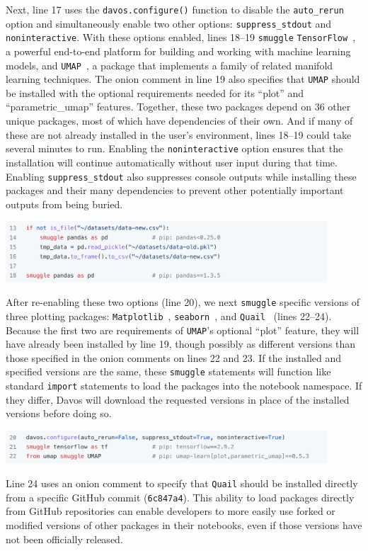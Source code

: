 \documentclass[preprint,12pt,a4paper]{elsarticle}
\begin{document}
Next, line 17 uses the \texttt{davos.configure()} function to disable
the \texttt{auto\_rerun} option and simultaneously enable two other
options: \texttt{suppress\_stdout} and \texttt{noninteractive}. With
these options enabled, lines 18--19 \texttt{smuggle}
\texttt{TensorFlow}~\cite{AbadEtal15}, a powerful end-to-end platform
for building and working with machine learning models, and
\texttt{UMAP}~\cite{McInEtal18}, a package that implements a family
of related manifold learning techniques. The onion comment in line 19
also specifies that \texttt{UMAP} should be installed with the
optional requirements needed for its ``plot'' and ``parametric\_umap''
features. Together, these two packages depend on 36 other unique
packages, most of which have dependencies of their own. And if many of
these are not already installed in the user's environment, lines
18--19 could take several minutes to run.  Enabling the
\texttt{noninteractive} option ensures that the installation will
continue automatically without user input during that time.  Enabling
\texttt{suppress\_stdout} also suppresses console outputs while installing
these packages and their many dependencies to prevent other potentially important outputs from being buried.
\begin{center}
\includegraphics[width=0.9\textwidth]{figs/example4}
\end{center}

After re-enabling these two options (line 20), we next \texttt{smuggle}
specific versions of three plotting packages:
\texttt{Matplotlib}~\cite{Hunt07}, \texttt{seaborn}~\cite{Wask21}, and
\texttt{Quail}~\cite{HeusEtal17} (lines 22--24). Because the first two
are requirements of \texttt{UMAP}'s optional ``plot'' feature, they
will have already been installed by line 19, though possibly as
different versions than those specified in the onion comments on lines
22 and 23. If the installed and specified versions are the same, these
\texttt{smuggle} statements will function like standard \texttt{import}
statements to load the packages into the notebook namespace. If they
differ, Davos will download the requested versions in place
of the installed versions before doing so.
\begin{center}
\includegraphics[width=0.9\textwidth]{figs/example5}
\end{center}
Line 24 uses an onion comment to specify that \texttt{Quail} should be
installed directly from a specific GitHub commit (\texttt{6c847a4}).
This ability to load packages directly from GitHub repositories can
enable developers to more easily use forked or modified versions of other
packages in their notebooks, even if those versions have not been
officially released.
\end{document}
